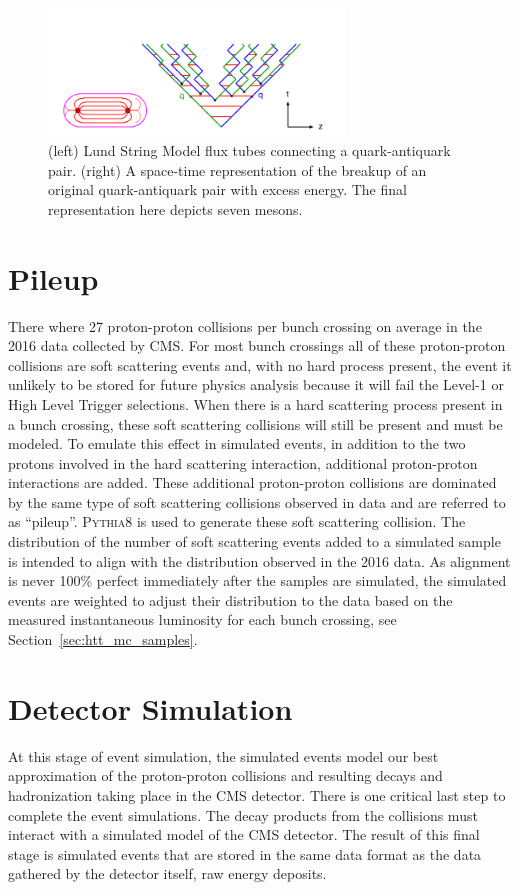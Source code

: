 \begin{figure}[htbp]
\centering
     \includegraphics[width=0.7\textwidth]{simulation/plots/lund_time-space.png}
     \caption{
(left) Lund String Model flux tubes connecting a quark-antiquark pair. (right) A
space-time representation of the breakup of an original quark-antiquark pair with
excess energy. The final representation here depicts seven mesons.
     }
     \label{fig:sim_lund_string}
\end{figure}



\section{Pileup}
There where 27 proton-proton collisions per bunch crossing on average
in the 2016 data collected by CMS.
For most bunch crossings all of these proton-proton collisions are soft
scattering events and, with no hard process present, the event it unlikely to be stored for
future physics analysis because it will fail the Level-1 or High Level Trigger selections. 
When there is a hard scattering process present in a bunch crossing,
these soft scattering collisions will still be present and must be modeled. 
To emulate this effect in simulated events, in addition to the two protons involved in the 
hard scattering interaction, additional proton-proton interactions are added. 
These additional proton-proton collisions are
dominated by the same type of soft scattering collisions observed in data and are referred to as ``pileup''.
\textsc{Pythia8} is used to generate these soft scattering collision. 
The distribution of the number of soft scattering events added to a simulated 
sample is intended to align with the distribution observed in the 2016 data.
As alignment is never 100\% perfect immediately after the samples are simulated, the simulated events
are weighted to adjust their distribution to the data based on the measured instantaneous
luminosity for each bunch crossing, see Section~\ref{sec:htt_mc_samples}.



\section{Detector Simulation}
At this stage of event simulation, the simulated events model our best approximation
of the proton-proton collisions and resulting decays and hadronization taking place
in the CMS detector. There is one critical last step to complete the event
simulations. The decay products from the collisions must interact with a simulated
model of the CMS detector. The result of this final stage is simulated events that
are stored in the same data format as the data gathered by the detector itself,
raw energy deposits.

